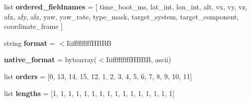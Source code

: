 \begin{DoxyCompactItemize}
list {\bfseries ordered\+\_\+fieldnames} = \mbox{[} \textquotesingle{}time\+\_\+boot\+\_\+ms\textquotesingle{}, \textquotesingle{}lat\+\_\+int\textquotesingle{}, \textquotesingle{}lon\+\_\+int\textquotesingle{}, \textquotesingle{}alt\textquotesingle{}, \textquotesingle{}vx\textquotesingle{}, \textquotesingle{}vy\textquotesingle{}, \textquotesingle{}vz\textquotesingle{}, \textquotesingle{}afx\textquotesingle{}, \textquotesingle{}afy\textquotesingle{}, \textquotesingle{}afz\textquotesingle{}, \textquotesingle{}yaw\textquotesingle{}, \textquotesingle{}yaw\+\_\+rate\textquotesingle{}, \textquotesingle{}type\+\_\+mask\textquotesingle{}, \textquotesingle{}target\+\_\+system\textquotesingle{}, \textquotesingle{}target\+\_\+component\textquotesingle{}, \textquotesingle{}coordinate\+\_\+frame\textquotesingle{} \mbox{]}
\item 
\mbox{\label{classpymavlink_1_1dialects_1_1v10_1_1MAVLink__set__position__target__global__int__message_a1f44599023bcf3b33fe0dff7a4a9a38f}} 
string {\bfseries format} = \textquotesingle{}$<$Iiifffffffff\+H\+B\+BB\textquotesingle{}
\item 
\mbox{\label{classpymavlink_1_1dialects_1_1v10_1_1MAVLink__set__position__target__global__int__message_a681a16fd36ead6e5f6e372ded9523449}} 
{\bfseries native\+\_\+format} = bytearray(\textquotesingle{}$<$Iiifffffffff\+H\+B\+BB\textquotesingle{}, \textquotesingle{}ascii\textquotesingle{})
\item 
\mbox{\label{classpymavlink_1_1dialects_1_1v10_1_1MAVLink__set__position__target__global__int__message_a749d8ef9170f92a1e55452ddb4b1ecc3}} 
list {\bfseries orders} = \mbox{[}0, 13, 14, 15, 12, 1, 2, 3, 4, 5, 6, 7, 8, 9, 10, 11\mbox{]}
\item 
\mbox{\label{classpymavlink_1_1dialects_1_1v10_1_1MAVLink__set__position__target__global__int__message_a23696cc6495ea29240662106a2d8c938}} 
list {\bfseries lengths} = \mbox{[}1, 1, 1, 1, 1, 1, 1, 1, 1, 1, 1, 1, 1, 1, 1, 1\mbox{]}
\item 
\mbox{\label{classpymavlink_1_1dialects_1_1v10_1_1MAVLink__set__position__target__global__int__message_a0428e5ec0083bc15b8443d73f64d8977}} 

\end{DoxyCompactItemize}
